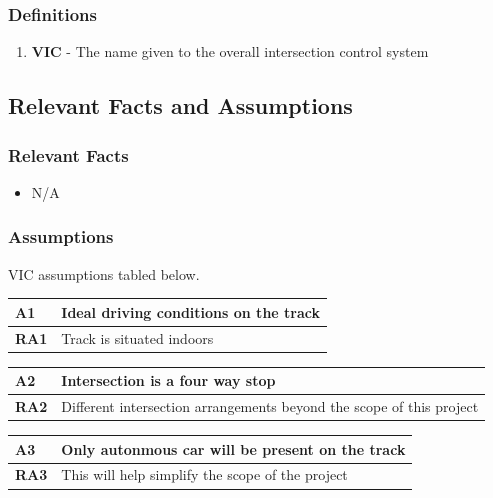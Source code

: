 \documentclass [11pt]{article}
\begin{document}
\subsubsection{Definitions}
\begin{enumerate}
	\itemsep0pt
	\item \textbf{VIC} - The name given to the overall intersection control system
\end{enumerate}

	
\subsection{Relevant Facts and Assumptions} 

\subsubsection{Relevant Facts}
\begin{itemize}
	\item N/A
\end{itemize}

\subsubsection{Assumptions}
VIC assumptions tabled below. 
\begin{longtable}{| p{ } | p{ } | }\hline 
\textbf{A1} & \textbf{Ideal driving conditions on the track} \\ \hline
\textbf{RA1} & Track is situated indoors \\ \hline 
\end{longtable}

\begin{longtable}{| p{ } | p{ } | }\hline 
\textbf{A2} & \textbf{Intersection is a four way stop} \\ \hline
\textbf{RA2} &  Different intersection arrangements beyond the scope of this project \\ \hline
\end{longtable}

\begin{longtable}{| p{ } | p{ } | }\hline 
\textbf{A3} & \textbf{Only autonmous car will be present on the track} \\ \hline
\textbf{RA3} &  This will help simplify the scope of the project\\ \hline
\end{longtable}
\end{document}
